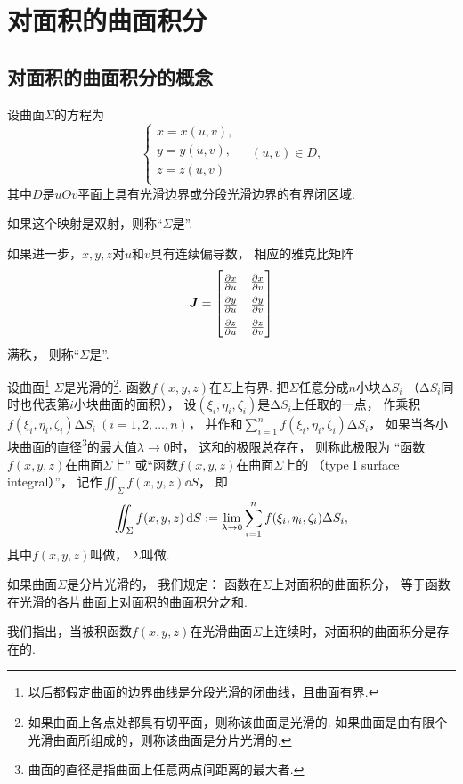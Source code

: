 \section{对面积的曲面积分}
\subsection{对面积的曲面积分的概念}
\begin{definition}
设曲面\(\Sigma\)的方程为\[
	\left\{ \begin{array}{l}
		x = x(u,v), \\
		y = y(u,v), \\
		z = z(u,v) \\
	\end{array} \right.
	\quad
	(u,v) \in D,
\]
其中\(D\)是\(uOv\)平面上具有光滑边界或分段光滑边界的有界闭区域.

如果这个映射是双射，则称“\(\Sigma\)是”.

如果进一步，\(x,y,z\)对\(u\)和\(v\)具有连续偏导数，
相应的雅克比矩阵\[
	\def\arraystretch{1.5}
	\vb{J} = \begin{bmatrix}
		\pdv{x}{u} & \pdv{x}{v} \\
		\pdv{y}{u} & \pdv{y}{v} \\
		\pdv{z}{u} & \pdv{z}{v}
	\end{bmatrix}
\]满秩，
则称“\(\Sigma\)是”.
\end{definition}

\begin{definition}
设曲面\footnote{以后都假定曲面的边界曲线是分段光滑的闭曲线，且曲面有界.}%
\(\Sigma\)是光滑的\footnote{如果曲面上各点处都具有切平面，则称该曲面是光滑的.
如果曲面是由有限个光滑曲面所组成的，则称该曲面是分片光滑的.}.
函数\(f(x,y,z)\)在\(\Sigma\)上有界.
把\(\Sigma\)任意分成\(n\)小块\(\increment S_i\)
（\(\increment S_i\)同时也代表第\(i\)小块曲面的面积），
设\((\xi_i,\eta_i,\zeta_i)\)是\(\increment S_i\)上任取的一点，
作乘积\(f(\xi_i,\eta_i,\zeta_i) \increment S_i\ (i=1,2,\dotsc,n)\)，
并作和\(\sum_{i=1}^n f(\xi_i,\eta_i,\zeta_i) \increment S_i\)，
如果当各小块曲面的直径\footnote{%
曲面的直径是指曲面上任意两点间距离的最大者.}的最大值\(\lambda\to0\)时，
这和的极限总存在，
则称此极限为
“函数\(f(x,y,z)\)在曲面\(\Sigma\)上”
或“函数\(f(x,y,z)\)在曲面\(\Sigma\)上的%
（type I surface integral）”，
记作\(\iint_\Sigma f(x,y,z) \dd{S}\)，
即\[
	\iint_\Sigma f(x,y,z)\dd{S}
	:=
	\lim_{\lambda\to0} \sum_{i=1}^n f(\xi_i,\eta_i,\zeta_i) \Delta S_i,
\]
其中\(f(x,y,z)\)叫做，
\(\Sigma\)叫做.

如果曲面\(\Sigma\)是分片光滑的，
我们规定：
函数在\(\Sigma\)上对面积的曲面积分，
等于函数在光滑的各片曲面上对面积的曲面积分之和.
\end{definition}
我们指出，当被积函数\(f(x,y,z)\)在光滑曲面\(\Sigma\)上连续时，对面积的曲面积分是存在的.

